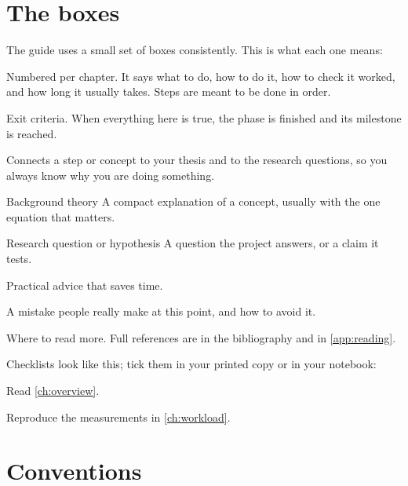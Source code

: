 \section*{The boxes}

The guide uses a small set of boxes consistently. This is what each one means:

\begin{stepbox}[title={\faShoePrints\enspace Step~N.M\quad An action for you to take}]{}
Numbered per chapter. It says what to do, how to do it, how to check it worked,
and how long it usually takes. Steps are meant to be done in order.
\end{stepbox}
\begin{donebox}
Exit criteria. When everything here is true, the phase is finished and its
milestone is reached.
\end{donebox}
\begin{whybox}
Connects a step or concept to your thesis and to the research questions, so you
always know why you are doing something.
\end{whybox}
\begin{conceptbox}{Background theory}
A compact explanation of a concept, usually with the one equation that matters.
\end{conceptbox}
\begin{rqbox}{Research question or hypothesis}
A question the project answers, or a claim it tests.
\end{rqbox}
\begin{tipbox}
Practical advice that saves time.
\end{tipbox}
\begin{pitfallbox}
A mistake people really make at this point, and how to avoid it.
\end{pitfallbox}
\begin{readbox}
Where to read more. Full references are in the bibliography and in
\cref{app:reading}.
\end{readbox}

Checklists look like this; tick them in your printed copy or in your notebook:
\begin{checklist}
  \item Read \cref{ch:overview}.
  \item Reproduce the measurements in \cref{ch:workload}.
\end{checklist}

\section*{Conventions}

